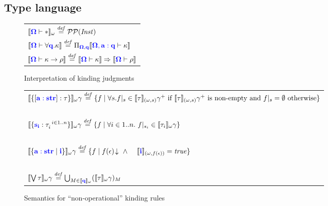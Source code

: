 \documentclass[sigplan,10pt,review,anonymous]{acmart}
\newcommand{\blum}[1]{\mathbf{\color{blue}{#1}}}
\newcommand{\defeq}{\overset{\mathit{def}}{=}}
\newcommand{\sem}[1]{\llbracket #1 \rrbracket}
\begin{document}
\subsection{Type language}


\begin{figure}

\begin{small}
\begin{tabular}{l}
$\sem{\blum{\Omega} \vdash \ast}_\omega \defeq \mathcal P \mathcal P (\mathit{Inst})$\\
$\sem{\blum{\Omega} \vdash \forall \blum{q}. \kappa} \defeq \Pi_{\blum{\Omega},\blum{q}} \sem{\blum{\Omega, a : q} \vdash \kappa}$\\
$\sem{\blum{\Omega} \vdash \kappa \to \rho} \defeq \sem{\blum{\Omega} \vdash \kappa} \Rightarrow \sem{\blum{\Omega} \vdash \rho}$
\end{tabular}
\end{small}
\caption{Interpretation of kinding judgments}
\label{fig:kind-interp}
\end{figure}

\begin{figure*}
\begin{tabular}{l}
$\sem{\{ [\blum{a : str}] : \tau \}}_\omega \gamma \defeq \{ f \mid \forall s. f |_s \in \sem{\tau}_{(\omega,s)} \gamma^+ \text{ if } \sem{\tau}_{(\omega,s)} \gamma^+ \text{ is non-empty } \text{and } f |_s = \emptyset \text{ otherwise} \}$ \\~\\
$\sem{\{ \blum{s_i} : \tau_i^{~i \in 1..n}\}}_\omega \gamma \defeq \{ f \mid \forall i \in 1..n.~f |_{s_i} \in \sem{\tau_i}_{\omega} \gamma \}$\\~\\
$\sem{\{ \blum{a : str} \mid \blum{i} \}}_\omega \gamma \defeq \{ f \mid f(\epsilon) \! \downarrow~\wedge~~~~\sem{\blum{i}}_{(\omega, f(\epsilon))} = \mathit{true} \}$\\~\\
$\sem{\bigvee \tau}_{\omega} \gamma \defeq \bigcup_{M \in \sem{\blum{q}}_\omega} (\sem{\tau}_{\omega} \gamma)_M$
\end{tabular}

\caption{Semantics for ``non-operational'' kinding rules}
\label{fig:kindsem-direct}
\end{figure*}
\end{document}
